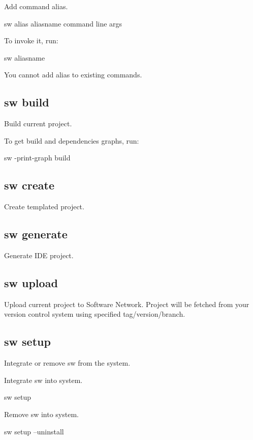 Add command alias.
\begin{command}
sw alias aliasname command line args
\end{command}

To invoke it, run:
\begin{command}
sw aliasname
\end{command}

You cannot add alias to existing commands.

\subsection{sw build}

Build current project.

To get build and dependencies graphs, run:
\begin{command}
sw -print-graph build
\end{command}

\subsection{sw create}

Create templated project.

\subsection{sw generate}

Generate IDE project.

\subsection{sw upload}

Upload current project to Software Network.
Project will be fetched from your version control system using specified tag/version/branch.

\subsection{sw setup}

Integrate or remove sw from the system.

Integrate sw into system.

\begin{command}
sw setup
\end{command}

Remove sw into system.

\begin{command}
sw setup --uninstall
\end{command}

